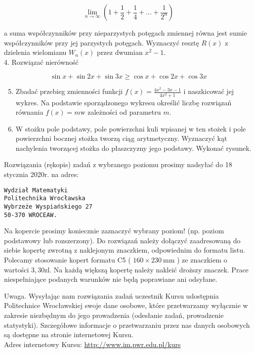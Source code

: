 \documentclass[10pt]{article}
\begin{document}
$$
\lim _{n \rightarrow \infty}\left(1+\frac{1}{2}+\frac{1}{4}+\ldots+\frac{1}{2^{n}}\right)
$$

a suma współczynników przy nieparzystych potęgach zmiennej równa jest sumie współczynników przy jej parzystych potęgach. Wyznaczyć resztę $R(x)$ z dzielenia wielomianu $W_{n}(x)$ przez dwumian $x^{2}-1$.\\
4. Rozwiązać nierówność

$$
\sin x+\sin 2 x+\sin 3 x \geqslant \cos x+\cos 2 x+\cos 3 x
$$

\begin{enumerate}
  \setcounter{enumi}{4}
  \item Zbadać przebieg zmienności funkcji $f(x)=\frac{4 x^{2}-3 x-1}{4 x^{2}+1}$ i naszkicować jej wykres. Na podstawie sporządzonego wykresu określić liczbę rozwiązań równania $f(x)=m \mathrm{w}$ zależności od parametru $m$.
  \item W stożku pole podstawy, pole powierzchni kuli wpisanej w ten stożek i pole powierzchni bocznej stożka tworzą ciąg arytmetyczny. Wyznaczyć kąt nachylenia tworzącej stożka do płaszczyzny jego podstawy. Wykonać rysunek.
\end{enumerate}

Rozwiązania (rękopis) zadań z wybranego poziomu prosimy nadsyłać do 18 stycznia 2020r. na adres:

\begin{verbatim}
Wydział Matematyki
Politechnika Wrocławska
Wybrzeże Wyspiańskiego 27
50-370 WROCEAW.
\end{verbatim}

Na kopercie prosimy koniecznie zaznaczyć wybrany poziom! (np. poziom podstawowy lub rozszerzony). Do rozwiązań należy dołączyć zaadresowaną do siebie kopertę zwrotną z naklejonym znaczkiem, odpowiednim do formatu listu. Polecamy stosowanie kopert formatu C5 ( $160 \times 230 \mathrm{~mm}$ ) ze znaczkiem o wartości $3,30 \mathrm{zl}$. Na każdą większą kopertę należy nakleić droższy znaczek. Prace niespełniające podanych warunków nie będą poprawiane ani odsyłane.

Uwaga. Wysyłając nam rozwiązania zadań uczestnik Kursu udostępnia Politechnice Wrocławskiej swoje dane osobowe, które przetwarzamy wyłącznie w zakresie niezbędnym do jego prowadzenia (odesłanie zadań, prowadzenie statystyki). Szczegółowe informacje o przetwarzaniu przez nas danych osobowych są dostępne na stronie internetowej Kursu.\\
Adres internetowy Kursu: \href{http://www.im.pwr.edu.pl/kurs}{http://www.im.pwr.edu.pl/kurs}
\end{document}
